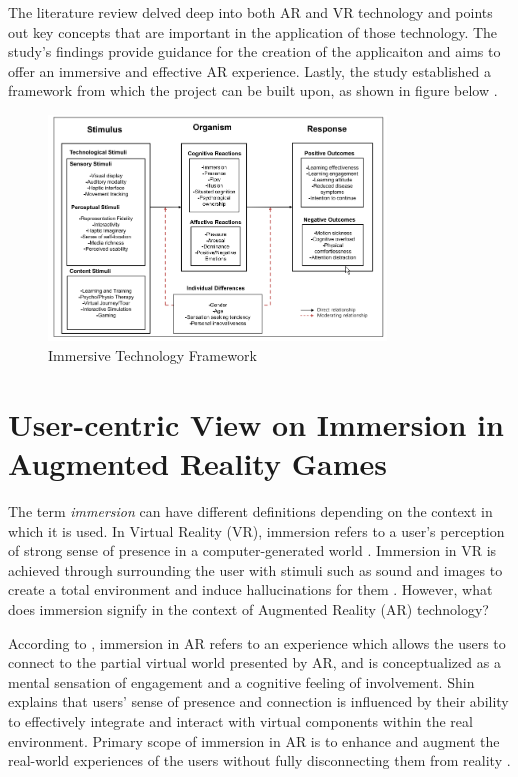 The literature review delved deep into both AR and VR technology and points out key concepts that are important in the application of those technology. The study's findings provide guidance for the creation of the applicaiton and aims to offer an immersive and effective AR experience. Lastly, the study established a framework from which the project can be built upon, as shown in figure below \cite{suh2018}.

\begin{figure}[h]
    \centering
    \includegraphics[width=0.8\textwidth]{figures/ImmersiveFramework.png}
    \caption{Immersive Technology Framework}
\end{figure}

\section{User-centric View on Immersion in Augmented Reality Games}

The term \textit{immersion} can have different definitions depending on the context in which it is used. In Virtual Reality (VR), immersion refers to a user's perception of strong sense of presence in a computer-generated world \cite{immersionAR}. Immersion in VR is achieved through surrounding the user with stimuli such as sound and images to create a total environment and induce hallucinations for them \cite{immersionAR}. However, what does immersion signify in the context of Augmented Reality (AR) technology? 

According to \cite{immersionAR}, immersion in AR refers to an experience which allows the users to connect to the partial virtual world presented by AR, and is conceptualized as a mental sensation of engagement and a cognitive feeling of involvement. Shin explains that users' sense of presence and connection is influenced by their ability to effectively integrate and interact with virtual components within the real environment. Primary scope of immersion in AR is to enhance and augment the real-world experiences of the users without fully disconnecting them from reality \cite{midles2024}.


